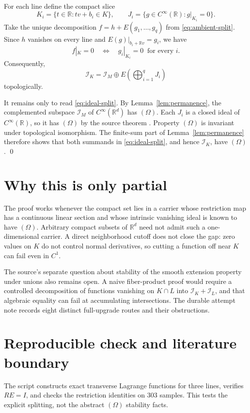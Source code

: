 \documentclass[10pt]{article}
\newcommand{\R}{\mathbb R}
\newcommand{\I}{\mathcal I}
\newcommand{\Om}{(\Omega)}
\newcommand{\Cin}{C^\infty}
\begin{document}
For each line define the compact slice
\[
 K_i=\{t\in\R:tv+b_i\in K\},
 \qquad J_i=\{g\in\Cin(\R):g|_{K_i}=0\}.
\]
Take the unique decomposition \(f=h+E(g_1,\ldots,g_q)\) from
\eqref{eq:ambient-split}.  Since \(h\) vanishes on every line and
\(E(g)|_{b_i+\R v}=g_i\), we have
\[
 f|_K=0 \quad\Longleftrightarrow\quad
 g_i|_{K_i}=0\ \text{ for every }i.
\]
Consequently,
\begin{equation}
 \I_K=\I_M\oplus E\!\left(\bigoplus_{i=1}^qJ_i\right)
 \label{eq:ideal-split}
\end{equation}
topologically.

It remains only to read \eqref{eq:ideal-split}.  By
Lemma~\ref{lem:permanence}, the complemented subspace \(\I_M\) of
\(\Cin(\R^d)\) has \(\Om\).  Each \(J_i\) is a closed ideal of
\(\Cin(\R)\), so it has
\(\Om\) by the source theorem \cite[Theorem 2.1]{FJW}.  Property \(\Om\)
is invariant under topological isomorphism.  The finite-sum part of
Lemma~\ref{lem:permanence} therefore shows that both summands in
\eqref{eq:ideal-split}, and hence \(\I_K\), have \(\Om\). \qed

\section*{Why this is only partial}

The proof works whenever the compact set lies in a carrier whose restriction
map has a continuous linear section and whose intrinsic vanishing ideal is
known to have \(\Om\).  Arbitrary compact subsets of \(\R^d\) need not admit
such a one-dimensional carrier.  A direct neighborhood cutoff does not close
the gap: zero values on \(K\) do not control normal derivatives, so cutting a
function off near \(K\) can fail even in \(C^1\).

The source's separate question about stability of the smooth extension
property under unions also remains open.  A naive fiber-product proof would
require a controlled decomposition of functions vanishing on \(K\cap L\)
into \(\I_K+\I_L\), and that algebraic equality can fail at accumulating
intersections.  The durable attempt note records eight distinct full-upgrade
routes and their obstructions.

\section*{Reproducible check and literature boundary}

The script  constructs exact
transverse Lagrange functions for three lines, verifies \(RE=I\), and checks
the restriction identities on 303 samples.  This tests the explicit splitting,
not the abstract \(\Om\) stability facts.
\end{document}
